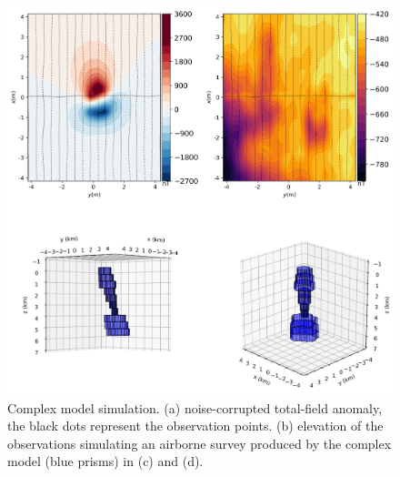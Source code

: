 \begin{figure}
    \centering
    \includegraphics[scale=.5]{figures/complex_model_data.png}
    \caption{Complex model simulation. (a) noise-corrupted total-field anomaly, the black dots represent the observation points. (b) elevation of the observations simulating an airborne survey produced by the complex model (blue prisms) in (c) and (d).
}
    \label{fig:complex_model}
\end{figure}

